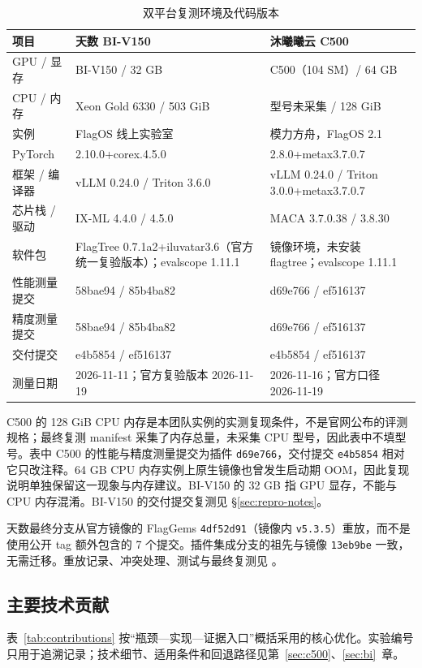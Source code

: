 \documentclass[11pt,a4paper]{ctexart}
\newcommand{\secref}[1]{\S\ref{#1}}
\begin{document}
\begin{table}[!htbp]
\centering\small
\caption{双平台复测环境及代码版本\label{tab:environment}}
\begin{tabularx}{\linewidth}{@{}p{2.2cm}YY@{}}
\toprule
项目 & 天数 BI-V150 & 沐曦曦云 C500 \\
\midrule
GPU / 显存 & BI-V150 / 32 GB & C500（104 SM）/ 64 GB \\
CPU / 内存 & Xeon Gold 6330 / 503 GiB & 型号未采集 / 128 GiB \\
实例 & FlagOS 线上实验室 & 模力方舟，FlagOS 2.1 \\
PyTorch & 2.10.0+corex.4.5.0 & 2.8.0+metax3.7.0.7 \\
框架 / 编译器 & vLLM 0.24.0 / Triton 3.6.0 & vLLM 0.24.0 / Triton 3.0.0+metax3.7.0.7 \\
芯片栈 / 驱动 & IX-ML 4.4.0 / 4.5.0 & MACA 3.7.0.38 / 3.8.30 \\
软件包 & FlagTree 0.7.1a2+iluvatar3.6（官方统一复验版本）；evalscope 1.11.1 & 镜像环境，未安装 flagtree；evalscope 1.11.1 \\
性能测量提交 & 58bae94 / 85b4ba82 & d69e766 / ef516137 \\
精度测量提交 & 58bae94 / 85b4ba82 & d69e766 / ef516137 \\
交付提交 & e4b5854 / ef516137 & e4b5854 / ef516137 \\
测量日期 & 2026-11-11；官方复验版本 2026-11-19 & 2026-11-16；官方口径 2026-11-19 \\
\bottomrule
\end{tabularx}
\end{table}

C500 的 128 GiB CPU 内存是本团队实例的实测复现条件，不是官网公布的评测规格；最终复测 manifest 采集了内存总量，未采集 CPU 型号，因此表中不填型号。表中 C500 的性能与精度测量提交为插件 \texttt{d69e766}，交付提交 \texttt{e4b5854} 相对它只改注释。64 GB CPU 内存实例上原生镜像也曾发生启动期 OOM，因此复现说明单独保留这一现象与内存建议。BI-V150 的 32 GB 指 GPU 显存，不能与 CPU 内存混淆。BI-V150 的交付提交复测见 \secref{sec:repro-notes}。

天数最终分支从官方镜像的 FlagGems \texttt{4df52d91}（镜像内 \texttt{v5.3.5}）重放，而不是使用公开 tag 额外包含的 7 个提交。插件集成分支的祖先与镜像 \texttt{13eb9be} 一致，无需迁移。重放记录、冲突处理、测试与最终复测见 。

\subsection{主要技术贡献}
表~\ref{tab:contributions} 按“瓶颈—实现—证据入口”概括采用的核心优化。实验编号只用于追溯记录；技术细节、适用条件和回退路径见第~\ref{sec:c500}、\ref{sec:bi}~章。
\end{document}
